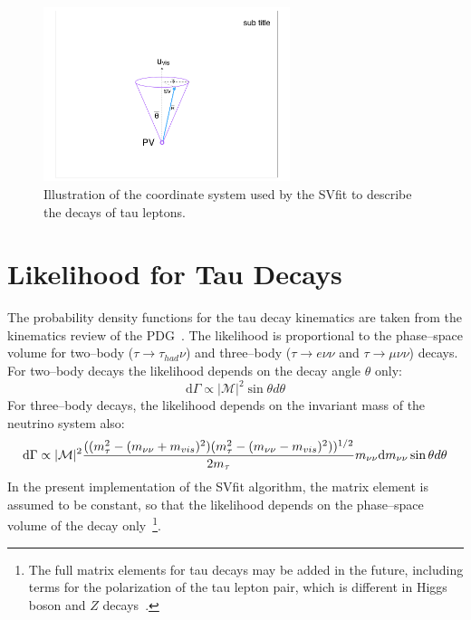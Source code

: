 \begin{figure}[t]
\begin{center}
\includegraphics*[width=72mm]{svfit_chapter/figures/decay_parameters_graphic.pdf}
\caption[Coordinate system of the SVfit]{Illustration of the coordinate system
used by the SVfit to describe the decays of tau leptons.}
\label{fig:svFitDecayParDiagram}
\end{center}
\end{figure} 

\section{Likelihood for Tau Decays}

The probability density functions for the tau decay kinematics are taken from
the kinematics review of the PDG~\cite{PDG}.  The likelihood is proportional to
the phase--space volume for two--body ($\tau \to \tau_{had} \nu$) and
three--body ($\tau \to e \nu\nu$ and $\tau \to \mu \nu\nu$) decays.  For
two--body decays the likelihood depends on the decay angle $\theta$ only:
\begin{equation*}
\mathrm{d}\Gamma \propto |\mathcal{M}|^2 \sin \theta d \theta
\label{eq:pdfKineHadronic}
\end{equation*}
For three--body decays, the likelihood depends on the invariant mass of the
neutrino system also:
\begin{equation}
\mathrm{d}\Gamma \propto |\mathcal{M}|^2 
\frac{((m_{\tau}^2 - (m_{\nu\nu} + m_{vis})^2)(m_{\tau}^2 - (m_{\nu\nu} - m_{vis})^2))^{1/2}}
{2 m_{\tau}} 
m_{\nu\nu}
\mathrm{d}m_{\nu\nu}
\sin \theta d\theta 
\label{eq:pdfKineLeptonic}
\end{equation}
In the present implementation of the SVfit algorithm, the matrix element is
assumed to be constant, so that the likelihood depends on the phase--space
volume of the decay only~\footnote{The full matrix elements for tau decays may
be added in the future, including terms for the polarization of the tau lepton
pair, which is different in Higgs boson and $Z$ decays~\cite{tauDecayPolarization}.
}.


